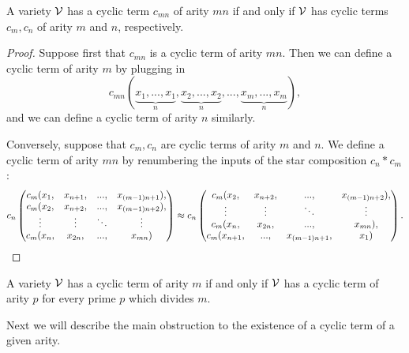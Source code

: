 \documentclass[letterpaper,11pt]{article}
\begin{document}
\begin{prop} A variety $\mathcal{V}$ has a cyclic term $c_{mn}$ of arity $mn$ if and only if $\mathcal{V}$ has cyclic terms $c_m, c_n$ of arity $m$ and $n$, respectively.
\end{prop}
\begin{proof} Suppose first that $c_{mn}$ is a cyclic term of arity $mn$. Then we can define a cyclic term of arity $m$ by plugging in
\[
c_{mn}(\underbrace{x_1, ..., x_1}_{n}, \underbrace{x_2, ..., x_2}_{n}, ..., \underbrace{x_m, ..., x_m}_{n}),
\]
and we can define a cyclic term of arity $n$ similarly.

Conversely, suppose that $c_m, c_n$ are cyclic terms of arity $m$ and $n$. We define a cyclic term of arity $mn$ by renumbering the inputs of the star composition $c_n*c_m$:
\[
c_n\begin{pmatrix}c_m(x_1, & x_{n+1}, & ..., & x_{(m-1)n+1}),\\
c_m(x_2, & x_{n+2}, & ..., & x_{(m-1)n+2}),\\
\vdots & \vdots & \ddots & \vdots\\
c_m(x_n, & x_{2n}, & ..., & x_{mn})
\end{pmatrix} \approx
c_n\begin{pmatrix} c_m(x_2, & x_{n+2}, & ..., & x_{(m-1)n+2}),\\
\vdots & \vdots & \ddots & \vdots\\
c_m(x_n, & x_{2n}, & ..., & x_{mn}),\\
c_m(x_{n+1}, & ..., & x_{(m-1)n+1}, & x_1)
\end{pmatrix}.\qedhere
\]
\end{proof}

\begin{cor} A variety $\mathcal{V}$ has a cyclic term of arity $m$ if and only if $\mathcal{V}$ has a cyclic term of arity $p$ for every prime $p$ which divides $m$.
\end{cor}

Next we will describe the main obstruction to the existence of a cyclic term of a given arity.
\end{document}
